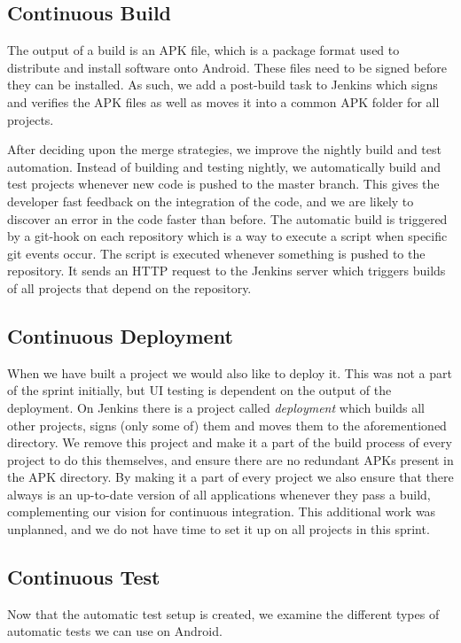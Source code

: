 
\subsection{Continuous Build}
The output of a build is an APK file, which is a package format used to distribute and install software onto Android. These files need to be signed before they can be installed. As such, we add a post-build task to Jenkins which signs and verifies the APK files as well as moves it into a common APK folder for all projects.

After deciding upon the merge strategies, we improve the nightly build and test automation. Instead of building and testing nightly, we automatically build and test projects whenever new code is pushed to the master branch. This gives the developer fast feedback on the integration of the code, and we are likely to discover an error in the code faster than before. The automatic build is triggered by a git-hook on each repository which is a way to execute a script when specific git events occur. The script is executed whenever something is pushed to the repository. It sends an HTTP request to the Jenkins server which triggers builds of all projects that depend on the repository.
\subsection{Continuous Deployment}
\label{sec:auto_deploy}
When we have built a project we would also like to deploy it. This was not a part of the sprint initially, but UI testing is dependent on the output of the deployment. On Jenkins there is a project called \emph{deployment} which builds all other projects, signs (only some of) them and moves them to the aforementioned directory. We remove this project and make it a part of the build process of every project to do this themselves, and ensure there are no redundant APKs present in the APK directory. By making it a part of every project we also ensure that there always is an up-to-date version of all applications whenever they pass a build, complementing our vision for continuous integration. This additional work was unplanned, and we do not have time to set it up on all projects in this sprint.

\subsection{Continuous Test}
\label{sec:test_automation}
Now that the automatic test setup is created, we examine the different types of automatic tests we can use on Android.

